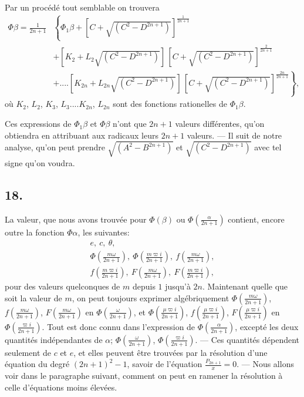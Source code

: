 \documentclass{article}
\begin{document}
Par un procédé tout semblable on trouvera
\[ \begin{aligned}
\Phi\beta=\frac{1}{2n+1}&\left\{\Phi_{1}\beta+[C+\sqrt{(C^{2}-D^{2n+1})}]^{\frac{1}{2n+1}}\right.\\
&+[K_{2}+L_{2}\sqrt{(C^{2}-D^{2n+1})}]\,[C+\sqrt{(C^{2}-D^{2n+1})}]^{\frac{2}{2n+1}}\\
&\left.+....[K_{2n}+L_{2n}\sqrt{(C^{2}-D^{2n+1})}]\,[C+\sqrt{(C^{2}-D^{2n+1})}]^{\frac{2n}{2n+1}}\right\},
\end{aligned} \tag{88.} \]
où $K_{2}$, $L_{2}$, $K_{3}$, $L_{3}....K_{2n}$, $L_{2n}$ sont des fonctions rationelles de $\Phi_{1}\beta$.


Ces expressions de $\Phi_{1}\beta$ et $\Phi\beta$ n'ont que $2n+1$ valeurs différentes, qu'on obtiendra en attribuant aux radicaux leurs $2n+1$ valeurs. --- Il suit de notre analyse, qu'on peut prendre $\sqrt{(A^{2}-B^{2n+1})}$ et $\sqrt{(C^{2}-D^{2n+1})}$ avec tel signe qu'on voudra.

\subsection*{18.}

La valeur, que nous avons trouvée pour $\Phi(\beta)$ ou $\Phi\left(\frac{\alpha}{2n+1}\right)$ contient, encore outre la fonction $\Phi\alpha$, les suivantes:
\[ \begin{gathered}
e,\ c,\ \theta,\\
\Phi\left(\frac{m\omega}{2n+1}\right),\ \Phi\left(\frac{m\varpi i}{2n+1}\right),\ f\left(\frac{m\omega}{2n+1}\right),\\
f\left(\frac{m\varpi i}{2n+1}\right),\ F\left(\frac{m\omega}{2n+1}\right),\ F\left(\frac{m\varpi i}{2n+1}\right),
\end{gathered} \]
pour des valeurs quelconques de $m$ depuis $1$ jusqu'à $2n$. Maintenant quelle que soit la valeur de $m$, on peut toujours exprimer algébriquement $\Phi\left(\frac{m\omega}{2n+1}\right)$, $f\left(\frac{m\omega}{2n+1}\right)$, $F\left(\frac{m\omega}{2n+1}\right)$ en $\Phi\left(\frac{\omega}{2n+1}\right)$, et $\Phi\left(\frac{\mu\varpi i}{2n+1}\right)$, $f\left(\frac{\mu\varpi i}{2n+1}\right)$, $F\left(\frac{\mu\varpi i}{2n+1}\right)$ en $\Phi\left(\frac{\varpi i}{2n+1}\right)$. Tout est donc connu dans l'expression de $\Phi\left(\frac{\alpha}{2n+1}\right)$, excepté les deux quantités indépendantes de $\alpha$; $\Phi\left(\frac{\omega}{2n+1}\right)$, $\Phi\left(\frac{\varpi i}{2n+1}\right)$. --- Ces quantités dépendent seulement de $c$ et $e$, et elles peuvent être trouvées par la résolution d'une équation du degré $(2n+1)^{2}-1$, savoir de l'équation $\frac{P_{2n+1}}{x}=0$. --- Nous allons voir dans le paragraphe suivant, comment on peut en ramener la résolution à celle d'équations moins élevées.
\end{document}
